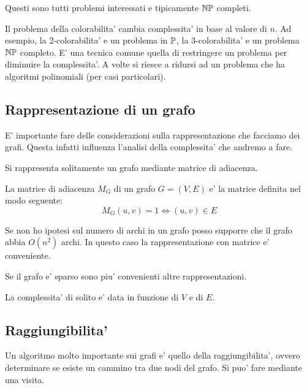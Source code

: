 Questi sono tutti problemi interessati e tipicamente $\mathbb{NP}$ completi.

Il problema della colorabilita' cambia complessita' in base al valore di $n$. Ad esempio, la
2-colorabilita' e un problema in $\mathbb{P}$, la 3-colorabilita' e un problema $\mathbb{NP}$ completo. E'
una tecnica comune quella di restringere un problema per diminuire la complessita'. A volte si
riesce a ridursi ad un problema che ha algoritmi polinomiali (per casi particolari).


\subsection{Rappresentazione di un grafo}

E' importante fare delle considerazioni sulla rappresentazione che facciamo dei grafi. Questa
infatti influenza l'analisi della complessita' che andremo a fare.

Si rappresenta solitamente un grafo mediante matrice di adiacenza.

\begin{defn}
    La matrice di adiacenza $M_{G}$ di un grafo $G = (V,E)$ e' la matrice definita nel modo
    seguente:
    \begin{equation*}
        M_{G}(u,v) = 1 \iff (u,v) \in E
    \end{equation*}
\end{defn}

Se non ho ipotesi sul numero di archi in un grafo posso supporre che il grafo abbia $O(n^{2})$ archi.
In questo caso la rappresentazione con matrice e' conveniente.

Se il grafo e' sparso sono piu' convenienti altre rappresentazioni.

La complessita' di solito e' data in funzione di $V$ e di $E$.

\subsection{Raggiungibilita'}

Un algoritmo molto importante sui grafi e' quello della raggiungibilita', ovvero determinare se
esiste un cammino tra due nodi del grafo. Si puo' fare mediante una visita.

